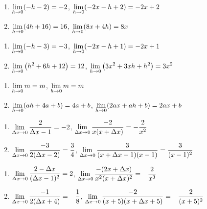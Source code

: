 \begin{enumerate}
\setcounter{enumi}{\value{HW}}

\item    $\displaystyle{\lim_{h \rightarrow 0} (-h-2) = -2}$,   $\displaystyle{\lim_{h \rightarrow 0} (-2x-h+2) = -2x+2}$   
\item   $\displaystyle{\lim_{h \rightarrow 0} (4h+16) = 16}$,   $\displaystyle{\lim_{h \rightarrow 0} (8x+4h) = 8x}$ 

\setcounter{HW}{\value{enumi}}
\end{enumerate}

\begin{enumerate}
\setcounter{enumi}{\value{HW}}

\item $\displaystyle{\lim_{h \rightarrow 0} (-h-3) = -3}$,   $\displaystyle{\lim_{h \rightarrow 0} (-2x-h+1) = -2x+1}$ 
\item $\displaystyle{\lim_{h \rightarrow 0} \left( h^2+6h+12 \right) = 12}$,   $\displaystyle{\lim_{h \rightarrow 0} \left(3x^{2} + 3xh + h^{2} \right) = 3x^{2}}$  

\setcounter{HW}{\value{enumi}}
\end{enumerate}

\begin{enumerate}
\setcounter{enumi}{\value{HW}}

\item  $\displaystyle{\lim_{h \rightarrow 0} m= m}$,   $\displaystyle{\lim_{h \rightarrow 0} m = m}$   
\item  $\displaystyle{\lim_{h \rightarrow 0} (ah + 4a+b) = 4a+b}$,   $\displaystyle{\lim_{h \rightarrow 0} (2ax + ah + b) = 2ax + b}$   

\setcounter{HW}{\value{enumi}}
\end{enumerate}

\begin{enumerate}
\setcounter{enumi}{\value{HW}}

\item  $\displaystyle{ \lim_{\Delta x \rightarrow 0} \dfrac{2}{\Delta x-1} = -2}$,   $\displaystyle{ \lim_{\Delta x \rightarrow 0} \dfrac{-2}{x(x+\Delta x)} = - \dfrac{2}{x^2}}$
 
\item  $\displaystyle{ \lim_{\Delta x \rightarrow 0} \dfrac{-3}{2(\Delta x - 2)} = \dfrac{3}{4}}$,   $\displaystyle{ \lim_{\Delta x \rightarrow 0} \dfrac{3}{(x+\Delta x-1)(x-1)} =  \dfrac{3}{(x-1)^2}}$  

\setcounter{HW}{\value{enumi}}
\end{enumerate}

\begin{enumerate}
\setcounter{enumi}{\value{HW}}

\item   $\displaystyle{ \lim_{\Delta x \rightarrow 0} \dfrac{2-\Delta x}{(\Delta x - 1)^2} =2}$,   $\displaystyle{ \lim_{\Delta x \rightarrow 0}\dfrac{-(2x+\Delta x)}{x^2(x+\Delta x)^2} =  - \dfrac{2}{x^3}}$   

\item    $\displaystyle{ \lim_{\Delta x \rightarrow 0} \dfrac{-1}{2(\Delta x+4)} = - \dfrac{1}{8}}$,   $\displaystyle{ \lim_{\Delta x \rightarrow 0} \dfrac{-2}{(x+5)(x+\Delta x+5)}=  - \dfrac{2}{(x+5)^2}}$    

\setcounter{HW}{\value{enumi}}
\end{enumerate}


